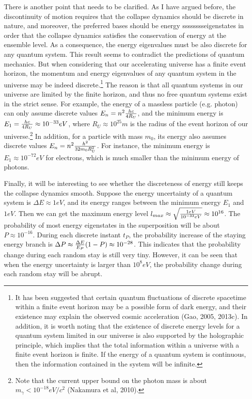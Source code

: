 There is another point that needs to be clarified. As I have argued before, the discontinuity of motion requires that the collapse dynamics should be discrete in nature, and moreover, the preferred bases should be energy sssssssseigenstates in order that the collapse dynamics satisfies the conservation of energy at the ensemble level. As a consequence, the energy eigenvalues must be also discrete for any quantum system. This result seems to contradict the predictions of quantum mechanics. But when considering that our accelerating universe has a finite event horizon, the momentum and energy eigenvalues of any quantum system in the universe may be indeed discrete.\footnote{It has been suggested that certain quantum fluctuations of discrete spacetime within a finite event horizon may be a possible form of dark energy, and their existence may explain the observed cosmic acceleration (Gao, 2005, 2013c). In addition, it is worth noting that the existence of discrete energy levels for a quantum system limited in our universe is also supported by the holographic principle, which implies that the total information within a universe with a finite event horizon is finite. If the energy of a quantum system is continuous, then the information contained in the system will be infinite.} The reason is that all quantum systems in our universe are limited by the finite horizon, and thus no free quantum systems exist in the strict sense. For example, the energy of a massless particle (e.g. photon) can only assume discrete values $E_{n} = n^2 {hc \over 4 R_U}$, and the minimum energy is $E_{1} ={hc \over 4 R_U} \approx 10^{-33}eV$, where $R_U \approx 10^{25}m$ is the radius of the event horizon of our universe.\footnote{Note that the current upper bound on the photon mass is about $m_{\gamma}< 10^{-18}eV/c^2$ (Nakamura et al, 2010).} In addition, for a  particle with mass $m_0$, its energy also assumes discrete values $E_n=n^2 {h^2 \over 32m_0R_U^2}$. For instance, the minimum energy is $E_{1} \approx 10^{-72}eV$ for electrons, which is much smaller than the minimum energy of photons.


Finally, it will be interesting to see whether the discreteness of energy still keeps the collapse dynamics smooth. Suppose the energy uncertainty of a quantum system is $\Delta E \approx 1eV$, and its energy ranges between the minimum energy $E_1$ and $1eV$. Then we can get the maximum energy level $l_{max} \approx \sqrt{1eV\over {10^{-33}eV}} \approx 10^{16}$. The probability of most energy eigenstates in the superposition will be about $P \approx 10^{-16}$. During each discrete instant $t_P$, the probability increase of the staying energy branch is $\Delta P \approx {\Delta E \over E_P}(1- P) \approx 10^{-28}$. This indicates that the probability change during each random stay is still very tiny. However, it can be seen that  when the energy uncertainty is larger than $10^{8}eV$,  the probability change during each random stay will be abrupt. 


